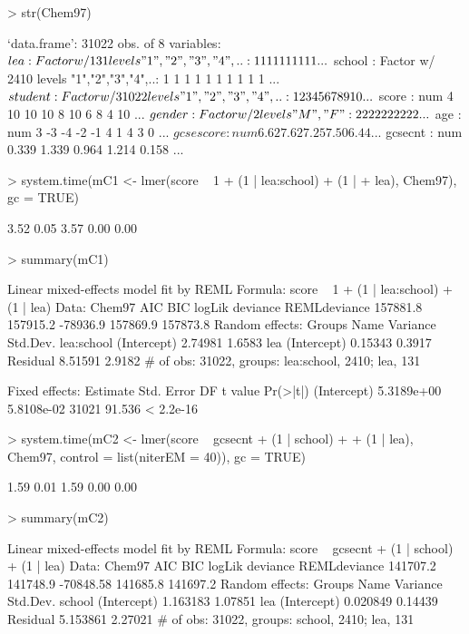 \documentclass[12pt]{article}
\begin{document}
\begin{Schunk}
\begin{Sinput}
> str(Chem97)
\end{Sinput}
\begin{Soutput}
`data.frame':	31022 obs. of  8 variables:
 $ lea      : Factor w/ 131 levels "1","2","3","4",..: 1 1 1 1 1 1 1 1 1 1 ...
 $ school   : Factor w/ 2410 levels "1","2","3","4",..: 1 1 1 1 1 1 1 1 1 1 ...
 $ student  : Factor w/ 31022 levels "1","2","3","4",..: 1 2 3 4 5 6 7 8 9 10 ...
 $ score    : num  4 10 10 10 8 10 6 8 4 10 ...
 $ gender   : Factor w/ 2 levels "M","F": 2 2 2 2 2 2 2 2 2 2 ...
 $ age      : num  3 -3 -4 -2 -1 4 1 4 3 0 ...
 $ gcsescore: num  6.62 7.62 7.25 7.50 6.44 ...
 $ gcsecnt  : num  0.339 1.339 0.964 1.214 0.158 ...
\end{Soutput}
\begin{Sinput}
> system.time(mC1 <- lmer(score ~ 1 + (1 | lea:school) + (1 | 
+     lea), Chem97), gc = TRUE)
\end{Sinput}
\begin{Soutput}
[1] 3.52 0.05 3.57 0.00 0.00
\end{Soutput}
\begin{Sinput}
> summary(mC1)
\end{Sinput}
\begin{Soutput}
Linear mixed-effects model fit by REML
Formula: score ~ 1 + (1 | lea:school) + (1 | lea) 
   Data: Chem97 
      AIC      BIC   logLik deviance REMLdeviance
 157881.8 157915.2 -78936.9 157869.9     157873.8
Random effects:
 Groups     Name        Variance Std.Dev.
 lea:school (Intercept) 2.74981  1.6583  
 lea        (Intercept) 0.15343  0.3917  
 Residual               8.51591  2.9182  
# of obs: 31022, groups: lea:school, 2410; lea, 131

Fixed effects:
              Estimate Std. Error    DF t value  Pr(>|t|)
(Intercept) 5.3189e+00 5.8108e-02 31021  91.536 < 2.2e-16
\end{Soutput}
\begin{Sinput}
> system.time(mC2 <- lmer(score ~ gcsecnt + (1 | school) + 
+     (1 | lea), Chem97, control = list(niterEM = 40)), gc = TRUE)
\end{Sinput}
\begin{Soutput}
[1] 1.59 0.01 1.59 0.00 0.00
\end{Soutput}
\begin{Sinput}
> summary(mC2)
\end{Sinput}
\begin{Soutput}
Linear mixed-effects model fit by REML
Formula: score ~ gcsecnt + (1 | school) + (1 | lea) 
   Data: Chem97 
      AIC      BIC    logLik deviance REMLdeviance
 141707.2 141748.9 -70848.58 141685.8     141697.2
Random effects:
 Groups   Name        Variance Std.Dev.
 school   (Intercept) 1.163183 1.07851 
 lea      (Intercept) 0.020849 0.14439 
 Residual             5.153861 2.27021 
# of obs: 31022, groups: school, 2410; lea, 131


\end{Soutput}
\end{Schunk}
\end{document}
